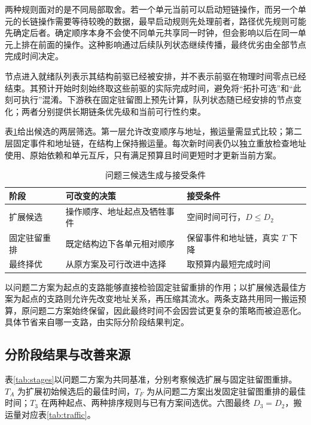 两种规则面对的是不同局部取舍。若一个单元当前可以启动短链操作，而另一个单元的长链操作需要等待较晚的数据，最早启动规则先处理前者，路径优先规则可能先确定后者。确定顺序本身不会使不同单元共享同一时钟，但会影响以后在同一单元上排在前面的操作。这种影响通过后续队列状态继续传播，最终优劣由全部节点完成时间决定。

节点进入就绪队列表示其结构前驱已经被安排，并不表示前驱在物理时间零点已经结束。其预计开始时刻始终取这些前驱的实际完成时间，避免将“拓扑可选”和“此刻可执行”混淆。下游秩在固定驻留图上预先计算，队列状态随已经安排的节点变化；两者分别提供长期链条优先级和当前可行性约束。

表\ref{tab:q3steps}给出候选的两层筛选。第一层允许改变顺序与地址，搬运量需显式比较；第二层固定事件和地址链，在结构上保持搬运量。每次新时间表仍以独立重放检查地址使用、原始依赖和单元互斥，只有满足预算且时间更短时才更新当前方案。
\begin{table}[H]\centering{}
\caption{问题三候选生成与接受条件}\label{tab:q3steps}
\begin{tabular}{p{.20\linewidth}p{.36\linewidth}p{.32\linewidth}}\toprule
阶段&可改变的决策&接受条件\\\midrule
扩展候选&操作顺序、地址起点及牺牲事件&空间时间可行，$D\le D_2$\\
固定驻留重排&既定结构边下各单元相对顺序&保留事件和地址链，真实 $T$ 下降\\
最终择优&从原方案及可行改进中选择&取预算内最短完成时间\\\bottomrule
\end{tabular}\end{table}

以问题二方案为起点的支路能够直接检验固定驻留重排的作用；以扩展候选最佳方案为起点的支路则允许先改变地址关系，再压缩其流水。两条支路共用同一搬运预算，原问题二方案始终保留，因此最终时间不会因尝试更复杂的策略而被迫恶化。具体节省来自哪一支路，由实际分阶段结果判定。

\subsection{分阶段结果与改善来源}
表\ref{tab:stages}以问题二方案为共同基准，分别考察候选扩展与固定驻留图重排。$T_A$ 为扩展初始候选后的最佳时间，$T_F$ 为从问题二方案出发固定驻留图重排的最佳时间；$T_3$ 在两种起点、两种排序规则与已有方案间选优。六图最终 $D_3=D_2$，搬运量对应表\ref{tab:traffic}。
\begin{table}[H]\centering\caption{预算不增加条件下的时间对照（周期）}\label{tab:stages}
\end{table}

